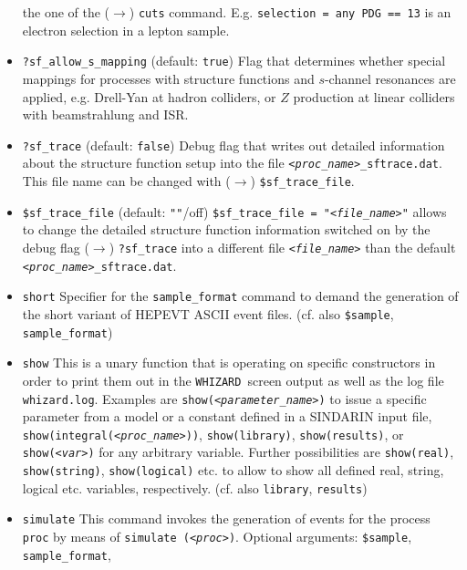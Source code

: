 \documentclass[12pt]{book}
\newcommand{\ttt}[1]{\texttt{#1}}
\newcommand{\whizard}{\texttt{WHIZARD}}
\begin{document}
\begin{itemize}
the one of the ($\to$) \ttt{cuts} command. E.g. \ttt{selection = any
PDG == 13} is an electron selection in a lepton sample. 
\item
\ttt{?sf\_allow\_s\_mapping} \qquad (default: \ttt{true}) \newline
Flag that determines whether special mappings for processes with
structure functions and $s$-channel resonances are applied,
e.g. Drell-Yan at hadron colliders, or $Z$ production at linear
colliders with beamstrahlung and ISR.
\item
\ttt{?sf\_trace} \qquad (default: \ttt{false}) \newline
Debug flag that writes out detailed information about the structure
function setup into the file \ttt{{\em <proc\_name>}\_sftrace.dat}. This
file name can be changed with ($\to$) \ttt{\$sf\_trace\_file}. 
\item
\ttt{\$sf\_trace\_file} \qquad (default: \ttt{""}/off) \newline
\ttt{\$sf\_trace\_file = "{\em <file\_name>}"} allows to change the detailed
structure function information switched on by the debug flag ($\to$)
\ttt{?sf\_trace} into a different file \ttt{{\em <file\_name>}} than the
default \ttt{{\em <proc\_name>}\_sftrace.dat}. 
\item
\ttt{short} \newline 
Specifier for the \ttt{sample\_format} command to demand the
generation of the short variant of HEPEVT ASCII event
files. (cf. also \ttt{\$sample}, \ttt{sample\_format}) 
\item
\ttt{show} \newline
This is a unary function that is operating on specific constructors in
order to print them out in the \whizard\ screen output as well as the
log file \ttt{whizard.log}. Examples are \ttt{show({\em <parameter\_name>})}
to issue a specific parameter from a model or a constant defined in a
SINDARIN input file, \ttt{show(integral({\em <proc\_name>}))},
\ttt{show(library)}, \ttt{show(results)}, or \ttt{show({\em <var>})} for any
arbitrary variable. Further possibilities are \ttt{show(real)},
\ttt{show(string)}, \ttt{show(logical)} etc. to allow to show all
defined real, string, logical etc. variables, respectively. 
(cf. also \ttt{library}, \ttt{results})
\item
\ttt{simulate} \newline
This command invokes the generation of events for the process
\ttt{proc} by means of \ttt{simulate ({\em <proc>})}.
Optional arguments: \ttt{\$sample}, \ttt{sample\_format},

\end{itemize}
\end{document}
